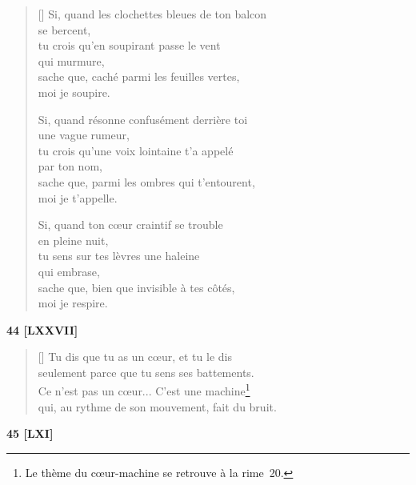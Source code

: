 \documentclass[a4paper,12pt]{book}
\begin{document}
\begin{verse}[\versewidth]
  Si, quand les clochettes bleues de ton balcon \\
  se bercent, \\
  tu crois qu'en soupirant passe le vent \\
  qui murmure, \\
  sache que, caché parmi les feuilles vertes, \\
  moi je soupire.

  Si, quand résonne confusément derrière toi \\
  une vague rumeur, \\
  tu crois qu'une voix lointaine t'a appelé \\
  par ton nom, \\
  sache que, parmi les ombres qui t'entourent, \\
  moi je t'appelle.

  Si, quand ton cœur craintif se trouble \\
  en pleine nuit, \\
  tu sens sur tes lèvres une haleine \\
  qui embrase, \\
  sache que, bien que invisible à tes côtés, \\
  moi je respire.
\end{verse}

\bigskip

\begin{center}
  \textbf{44 [LXXVII]}
   \end{center}

\settowidth{\versewidth}{qui, au rythme de son mouvement, fait du bruit.}

\begin{verse}[\versewidth]
  Tu dis que tu as un cœur, et tu le dis \\
  seulement parce que tu sens ses battements. \\
  Ce n'est pas un cœur... C'est une machine\footnote{Le thème du
  cœur-machine se retrouve à la rime~20.} \\
  qui, au rythme de son mouvement, fait du bruit.
\end{verse}

\bigskip

\begin{center}
  \textbf{45 [LXI]}
\end{center}
\end{document}
